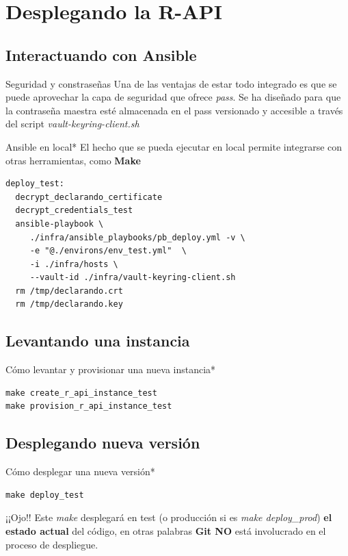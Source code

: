\documentclass[12pt, aspectratio=169]{beamer} %
\begin{document}
\section{Desplegando la R-API}
\subsection{Interactuando con Ansible}

\begin{frame}{Seguridad y constraseñas}
  Una de las ventajas de estar todo integrado es que se puede aprovechar la capa de seguridad que ofrece \textit{pass}. Se ha diseñado para que la contraseña maestra esté almacenada en el pass versionado y accesible a través del script \textit{vault-keyring-client.sh}

\end{frame}

\begin{frame}[fragile]{Ansible en local*}
El hecho que se pueda ejecutar en local permite integrarse con otras herramientas, como \textbf{Make}
\begin{verbatim}
deploy_test: 
  decrypt_declarando_certificate
  decrypt_credentials_test
  ansible-playbook \
     ./infra/ansible_playbooks/pb_deploy.yml -v \
     -e "@./environs/env_test.yml"  \
     -i ./infra/hosts \
     --vault-id ./infra/vault-keyring-client.sh
  rm /tmp/declarando.crt
  rm /tmp/declarando.key
\end{verbatim}
\end{frame}


\subsection{Levantando una instancia}
\begin{frame}[fragile]{Cómo levantar y provisionar una nueva instancia*}
\begin{verbatim}
make create_r_api_instance_test 
make provision_r_api_instance_test
\end{verbatim}
\end{frame}



\subsection{Desplegando nueva versión}
\begin{frame}[fragile]{Cómo desplegar una nueva versión*}
\begin{verbatim}
make deploy_test 
\end{verbatim}

  \begin{block}{¡¡Ojo!!}
    Este \textit{make} desplegará en test (o producción si es \textit{make deploy\_prod}) \textbf{el estado actual} del código, en otras palabras \textbf{Git NO} está involucrado en el proceso de despliegue.
  \end{block}

\end{frame}
\end{document}
